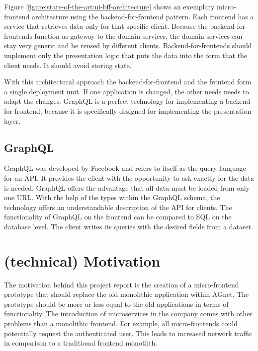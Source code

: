 Figure \ref{figure:state-of-the-art:ui-bff-architecture} shows an exemplary micro-frontend architecture using the backend-for-frontend pattern. Each frontend has a service that retrieves data only for that specific client. Because the backend-for-frontends function as gateway to the domain services, the domain services can stay very generic and be reused by different clients. Backend-for-frontends should implement only the presentation logic that puts the data into the form that the client needs. It should avoid storing state. \cite{misc:2019:leitner:backend-for-frontends}

With this architectural approach the backend-for-frontend and the frontend form a single deployment unit. If one application is changed, the other needs needs to adapt the changes. GraphQL is a perfect technology for implementing a backend-for-frontend, because it is specifically designed for implementing the presentation-layer.

\subsection{GraphQL}

GraphQL was developed by Facebook and refers to itself as the query language for an API. It provides the client with the opportunity to ask exactly for the data is needed. GraphQL offers the advantage that all data must be loaded from only one URL. With the help of the types within the GraphQL schema, the technology offers an understandable description of the
API for clients. \cite{misc:-:graphql-org} The functionality of GraphQL on the frontend can be compared to SQL on the database level. The client writes its queries with the desired fields from a dataset.

\section{(technical) Motivation}

The motivation behind this project report is the creation of a micro-frontend prototype that should replace the old monolithic application within AGnet. The prototype should be more or less equal to the old applications in terms of functionality. The introduction of microservices in the company comes with other problems than a monolithic frontend. For example, all micro-frontends could potentially request the authenticated user. This leads to increased network traffic in comparison to a traditional frontend monotlith.

